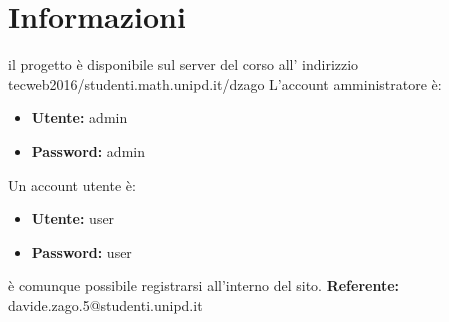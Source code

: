 \section{Informazioni}
il progetto è disponibile sul server del corso all' indirizzio tecweb2016/studenti.math.unipd.it/dzago \newline
L'account amministratore è:
\begin{itemize}
    \item \textbf{Utente:} admin
    \item \textbf{Password:} admin	
\end{itemize}
Un account utente è:
\begin{itemize}
	\item \textbf{Utente:} user
	\item \textbf{Password:} user
\end{itemize}
è comunque possibile registrarsi all'interno del sito.\newline
\textbf{Referente:} davide.zago.5@studenti.unipd.it
